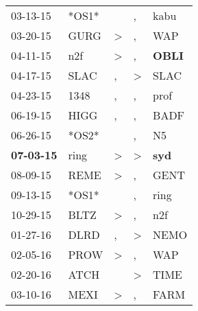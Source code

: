 \begin{supertabular}{p{0.07\textwidth}p{0.06\textwidth}p{0.02\textwidth}p{0.02\textwidth}p{0.06\textwidth}}
          03-13-15\textsuperscript{} &                            *OS1* &                  &             , &           kabu\textsuperscript{} \\
          03-20-15\textsuperscript{} &           GURG\textsuperscript{} &     \textgreater &             , &            WAP\textsuperscript{} \\
          04-11-15\textsuperscript{} &            n2f\textsuperscript{} &     \textgreater &             , &  \textbf{OBLI\textsuperscript{}} \\
          04-17-15\textsuperscript{} &           SLAC\textsuperscript{} &                , &  \textgreater &           SLAC\textsuperscript{} \\
          04-23-15\textsuperscript{} &           1348\textsuperscript{} &                , &             , &           prof\textsuperscript{} \\
          06-19-15\textsuperscript{} &           HIGG\textsuperscript{} &                , &             , &           BADF\textsuperscript{} \\
          06-26-15\textsuperscript{} &                            *OS2* &                  &             , &             N5\textsuperscript{} \\
 \textbf{07-03-15\textsuperscript{}} &           ring\textsuperscript{} &     \textgreater &  \textgreater &   \textbf{syd\textsuperscript{}} \\
          08-09-15\textsuperscript{} &           REME\textsuperscript{} &     \textgreater &             , &           GENT\textsuperscript{} \\
          09-13-15\textsuperscript{} &                            *OS1* &                  &             , &           ring\textsuperscript{} \\
          10-29-15\textsuperscript{} &           BLTZ\textsuperscript{} &     \textgreater &             , &            n2f\textsuperscript{} \\
          01-27-16\textsuperscript{} &           DLRD\textsuperscript{} &                , &  \textgreater &           NEMO\textsuperscript{} \\
          02-05-16\textsuperscript{} &           PROW\textsuperscript{} &     \textgreater &             , &            WAP\textsuperscript{} \\
          02-20-16\textsuperscript{} &           ATCH\textsuperscript{} &                  &  \textgreater &           TIME\textsuperscript{} \\
          03-10-16\textsuperscript{} &           MEXI\textsuperscript{} &     \textgreater &             , &           FARM\textsuperscript{} \\

\end{supertabular}
